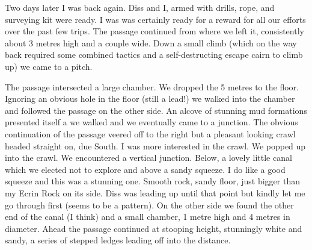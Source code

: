 Two days later I was back again. Diss and I, armed with drills, rope, and surveying kit were ready. I was was certainly ready for a reward for all our efforts over the past few trips. The passage continued from where we left it, consistently about 3 metres high and a couple wide. Down a small climb (which on the way back required some combined tactics and a self-destructing escape cairn to climb up) we came to a pitch.
 \begin{marginfigure}
\end{marginfigure}  
The passage intersected a large chamber. We dropped the 5 metres to the floor. Ignoring an obvious hole in the floor (still a lead!) we walked into the chamber and followed the passage on the other side. An alcove of stunning mud formations presented itself a we walked and we eventually came to a junction. The obvious continuation of the passage veered off to the right but a pleasant looking crawl headed straight on, due South. I was more interested in the crawl.  
We popped up into the crawl. We encountered a vertical junction. Below, a lovely little canal which we elected not to explore and above a sandy squeeze. I do like a good squeeze and this was a stunning one. Smooth rock, sandy floor, just bigger than my Ecrin Rock on its side. Diss was leading up until that point but kindly let me go through first (seems to be a pattern). On the other side we found the other end of the canal (I think) and a small chamber, 1 metre high and 4 metres in diameter. Ahead the passage continued at stooping height, stunningly white and sandy, a series of stepped ledges leading off into the distance.
 

